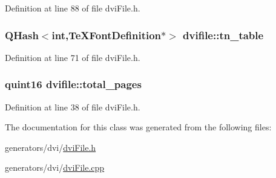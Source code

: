 Definition at line 88 of file dvi\+File.\+h.

\hypertarget{classdvifile_a05cb283609e6d1627940d14e8fc85b62}{
\subsubsection[{tn\+\_\+table}]{\setlength{\rightskip}{0pt plus 5cm}Q\+Hash$<$int,{\bf Te\+X\+Font\+Definition}$\ast$$>$ dvifile\+::tn\+\_\+table}}\label{classdvifile_a05cb283609e6d1627940d14e8fc85b62}


Definition at line 71 of file dvi\+File.\+h.

\hypertarget{classdvifile_a71577dbd82a462b855abc96be3b369c5}{
\subsubsection[{total\+\_\+pages}]{\setlength{\rightskip}{0pt plus 5cm}quint16 dvifile\+::total\+\_\+pages}}\label{classdvifile_a71577dbd82a462b855abc96be3b369c5}


Definition at line 38 of file dvi\+File.\+h.



The documentation for this class was generated from the following files\+:\begin{DoxyCompactItemize}
\item 
generators/dvi/\hyperlink{dviFile_8h}{dvi\+File.\+h}\item 
generators/dvi/\hyperlink{dviFile_8cpp}{dvi\+File.\+cpp}\end{DoxyCompactItemize}
